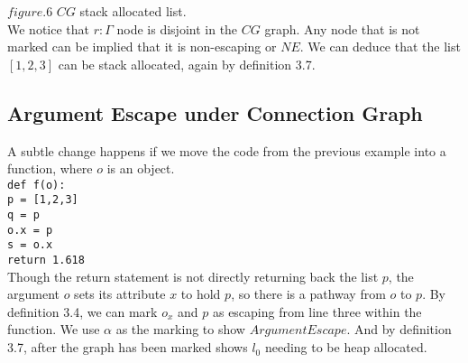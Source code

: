 \documentclass[11pt,article]{amsart}
\theoremstyle{definition}
\newcommand\tab[1][1cm]{\hspace*{#1}}
\numberwithin{equation}{subsection}
\begin{document}
\begin{multicols}{2}

$figure.6$ $CG$ stack allocated list.\\ 
We notice that $r:\Gamma$ node is disjoint in the $CG$ graph. Any node that is not marked can be implied that it is non-escaping or $NE$. We can deduce that the list $[1,2,3]$ can be stack allocated, again by definition 3.7.

\subsection{Argument Escape under Connection Graph}
A subtle change happens if we move the code from the previous example into a function, where $o$ is an object. \\
\texttt{def f(o):}\\
\tab\texttt{p = [1,2,3]}\\
\tab\texttt{q = p}\\
\tab\texttt{o.x = p}\\
\tab\texttt{s = o.x}\\
\tab\texttt{return 1.618}\\

Though the return statement is not directly returning back the list $p$, the argument $o$ sets its attribute $x$ to hold $p$, so there is a pathway from $o$ to $p$. By definition 3.4, we can mark $o_x$ and $p$ as escaping from line three within the function. We use $\alpha$ as the marking to show $ArgumentEscape$. And by definition 3.7, after the graph has been marked shows $l_0$ needing to be heap allocated.

\end{multicols}
\end{document}
